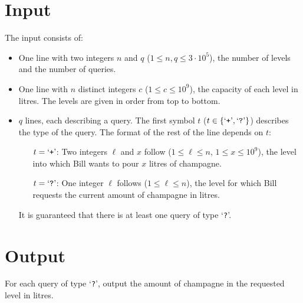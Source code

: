 \section*{Input}
The input consists of:
\begin{itemize}
    \item One line with two integers $n$ and $q$ ($1\leq n, q \leq 3 \cdot 10^5$), the number of levels and the number of queries.
    \item One line with $n$ distinct integers $c$ ($1\leq c \leq 10^9$), the capacity of each level in litres.
    The levels are given in order from top to bottom.
    \item $q$ lines, each describing a query.
    The first symbol $t$ ($t \in \{\text{`\texttt{+}'}, \text{`\texttt{?}'}\}$) describes the type of the query.
    The format of the rest of the line depends on $t$:
    \begin{itemize}[leftmargin=1.95cm]
	    \item[$t=\text{`\texttt{+}'}$:] Two integers $\ell$ and $x$ follow ($1 \leq \ell \leq n$, $1 \leq x \leq 10^9$), the level into which Bill wants to pour $x$ litres of champagne.
	    \item[$t=\text{`\texttt{?}'}$:] One integer $\ell$ follows ($1 \leq \ell \leq n$), the level for which Bill requests the current amount of champagne in litres.
    \end{itemize}
    It is guaranteed that there is at least one query of type `\texttt{?}'.
\end{itemize}

\section*{Output}
For each query of type `\texttt{?}', output the amount of champagne in the requested level in litres.
